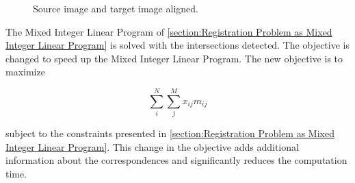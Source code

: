             \begin{figure}\centering
                \caption{Source image and target image aligned.}
                \label{fig:2D_aligned}
            \end{figure}

            The Mixed Integer Linear Program of \autoref{section:Registration Problem as Mixed Integer Linear Program} is solved with the intersections detected.
            The objective is changed to speed up the Mixed Integer Linear Program. The new objective is to maximize

            \begin{equation}
                \label{eq:objective_angles}
                \sum_{i}^{N} \sum_{j}^{M} x_{ij} m_{ij} 
            \end{equation}    

            subject to the constraints presented in \autoref{section:Registration Problem as Mixed Integer Linear Program}.
            This change in the objective adds additional information about the correspondences and significantly reduces the computation time.

